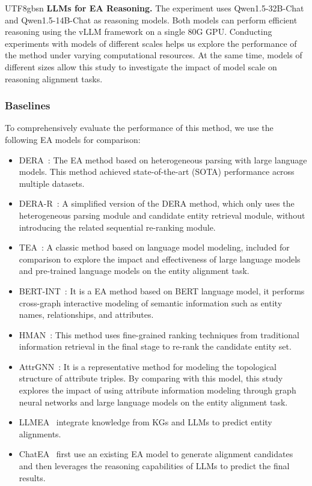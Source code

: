 \documentclass[preprint,12pt]{elsarticle}
\begin{document}
\begin{CJK}{UTF8}{gbsn}
\noindent\textbf{LLMs for EA Reasoning.} The experiment uses Qwen1.5-32B-Chat\cite{bai2023qwen} and Qwen1.5-14B-Chat\cite{bai2023qwen} as reasoning models. Both models can perform efficient reasoning using the vLLM framework on a single 80G GPU. Conducting experiments with models of different scales helps us explore the performance of the method under varying computational resources. At the same time, models of different sizes allow this study to investigate the impact of model scale on reasoning alignment tasks.

\subsubsection{Baselines}
To comprehensively evaluate the performance of this method, we use the following EA models for comparison:
\begin{itemize}
    \item DERA~\cite{dera}: The EA method based on heterogeneous parsing with large language models. This method achieved state-of-the-art (SOTA) performance across multiple datasets.
    \item DERA-R~\cite{dera}: A simplified version of the DERA method, which only uses the heterogeneous parsing module and candidate entity retrieval module, without introducing the related sequential re-ranking module. 
    \item TEA~\cite{tea}: A classic method based on language model modeling, included for comparison to explore the impact and effectiveness of large language models and pre-trained language models on the entity alignment task.
    \item BERT-INT~\cite{bertint}: It is a EA method based on BERT language model, it performs cross-graph interactive modeling of semantic information such as entity names, relationships, and attributes.
    \item HMAN~\cite{hman}: This method uses fine-grained ranking techniques from traditional information retrieval in the final stage to re-rank the candidate entity set. 
    \item AttrGNN~\cite{AttrGNN}: It is a representative method for modeling the topological structure of attribute triples. By comparing with this model, this study explores the impact of using attribute information modeling through graph neural networks and large language models on the entity alignment task.
    \item LLMEA~\cite{LLMEA} integrate knowledge from KGs and LLMs to predict entity alignments.
    \item ChatEA~\cite{ChatEA} first use an existing EA model to generate alignment candidates and then leverages the reasoning capabilities of LLMs to predict the final results.
\end{itemize}



\end{CJK}
\end{document}
